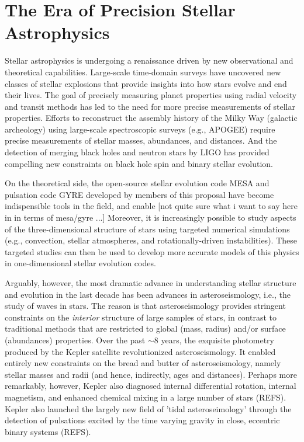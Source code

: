 \section{The Era of Precision Stellar Astrophysics}

Stellar astrophysics is undergoing a renaissance driven by new observational and theoretical capabilities. Large-scale time-domain surveys have uncovered new classes of stellar explosions that provide insights into how stars evolve and end their lives.  The goal of precisely measuring planet properties using radial velocity and transit methods has led to the need for more precise measurements of stellar properties.  Efforts to reconstruct the assembly history of the Milky Way (galactic archeology) using large-scale spectroscopic surveys (e.g., APOGEE) require precise measurements of stellar masses, abundances, and distances.   And the detection of merging black holes and neutron stars by LIGO has provided compelling new constraints on black hole spin and binary stellar evolution.   

On the theoretical side, the open-source stellar evolution code MESA and pulsation code GYRE developed by members of this proposal have become indispensible tools in the field, and enable  [not quite sure what i want to say here in in terms of mesa/gyre ...]   Moreover, it is increasingly possible to study aspects of the three-dimensional structure of stars using targeted numerical simulations (e.g., convection, stellar atmospheres, and rotationally-driven instabilities).  These targeted studies can then be used to develop more accurate models of this physics in one-dimensional stellar evolution codes.

Arguably, however, the most dramatic advance in understanding stellar structure and evolution in the last decade has been advances in asteroseismology, i.e., the study of waves in stars.   The reason is that asteroseismology provides stringent constraints on the {\em interior} structure of large samples of stars, in contrast to traditional methods that are restricted to global (mass, radius) and/or surface (abundances) properties.   Over the past $\sim 8$ years, the exquisite photometry produced by the Kepler satellite revolutionized asteroseismology.  It enabled entirely new constraints on the bread and butter of asteroseismology, namely stellar masses and radii (and hence, indirectly, ages and distances).  Perhaps more remarkably, however, Kepler also diagnosed internal differential rotation, internal magnetism, and enhanced chemical mixing in a large number of stars (REFS).  Kepler also launched the largely new field of 'tidal asteroseimology' through the detection of pulsations excited by the time varying gravity in close, eccentric binary systems (REFS). 

